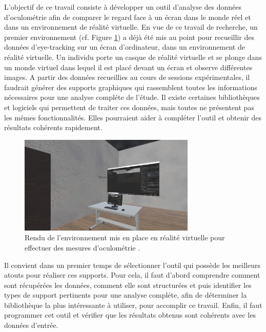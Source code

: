 \documentclass[hidelinks,12pt]{article}
\begin{document}
\bigskip
L'objectif de ce travail consiste à développer un outil d'analyse des données
d'oculométrie afin de comparer le regard face à un écran dans le monde réel et
dans un environnement de réalité virtuelle. En vue de ce travail de recherche,
un premier environnement (cf. Figure \ref{fig:environnement}) a déjà été mis au
point pour recueillir des données d'eye-tracking sur un écran d'ordinateur,
dans un environnement de réalité virtuelle. Un individu porte un casque de
réalité virtuelle et se plonge dans un monde virtuel dans lequel il est placé
devant un écran et observe différentes images. A partir des données recueillies
au cours de sessions expérimentales, il faudrait générer des supports
graphiques qui rassemblent toutes les informations nécessaires pour une analyse
compléte de l'étude. Il existe certaines bibliothèques et logiciels qui
permettent de traiter ces données, mais toutes ne présentent pas les mêmes
fonctionnalités. Elles pourraient aider à compléter l'outil et obtenir des
résultats cohérents rapidement.

\begin{figure}[htpb]
  \centering
  \includegraphics[width=0.75\textwidth,keepaspectratio=true]{environnement.png}
  \caption{Rendu de l'environnement mis en place en réalité virtuelle pour
    effectuer des mesures d'oculométrie \cite{img_environnement}.}
  \label{fig:environnement}
\end{figure}

\bigskip
Il convient dans un premier temps de sélectionner l'outil qui possède les
meilleurs atouts pour réaliser ces supports. Pour cela, il faut d'abord
comprendre comment sont récupérées les données, comment elle sont structurées
et puis identifier les types de support pertinents pour une analyse compléte,
afin de déterminer la bibliothèque la plus intéressante à utiliser, pour
accomplir ce travail. Enfin, il faut programmer cet outil et vérifier que les
résultats obtenus sont cohérents avec les données d'entrée.
\end{document}
